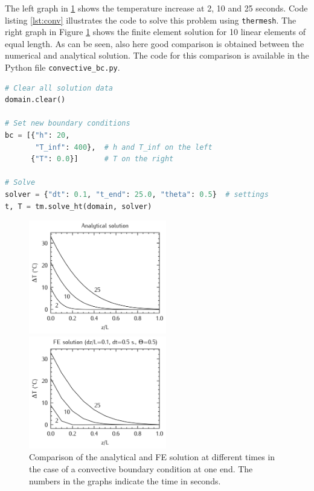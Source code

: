 \documentclass[10pt, a4paper, twoside, headinclude,footinclude, BCOR5mm]{scrartcl}
\begin{document}
The left graph in \ref{fig:conv_compare} shows the temperature increase at 2, 10 and 25 seconds. Code listing \ref{lst:conv} illustrates the code to solve this problem using \texttt{thermesh}. The right graph in Figure \ref{fig:conv_compare} shows the finite element solution for 10 linear elements of equal length. As can be seen, also here good comparison is obtained between the numerical and analytical solution. The code for this comparison is available in the Python file \texttt{convective\_bc.py}.

\lstset{basicstyle=\ttfamily}
\begin{minipage}{\linewidth}
\label{code:flux}
\begin{lstlisting}[language=Python, caption=Thermesh example for a constant heat flux at one end., label={lst:conv}, backgroundcolor=\color{light-gray}]
# Clear all solution data
domain.clear()

# Set new boundary conditions
bc = [{"h": 20,
       "T_inf": 400},  # h and T_inf on the left
      {"T": 0.0}]      # T on the right

# Solve
solver = {"dt": 0.1, "t_end": 25.0, "theta": 0.5}  # settings
t, T = tm.solve_ht(domain, solver)
\end{lstlisting}
\end{minipage}

\begin{figure}
\centering
\begin{minipage}{.5\textwidth}
  \centering
  \includegraphics[width=60mm]{fig/conv_analytical_sol.png}
\end{minipage}%
\begin{minipage}{.5\textwidth}
  \centering
  \includegraphics[width=60mm]{fig/conv_FE_t0.5_dt0.1s.png}
\end{minipage}
\caption{Comparison of the analytical and FE solution at different times in the case of a convective boundary condition at one end. The numbers in the graphs indicate the time in seconds.}
\label{fig:conv_compare}
\end{figure}
\end{document}
